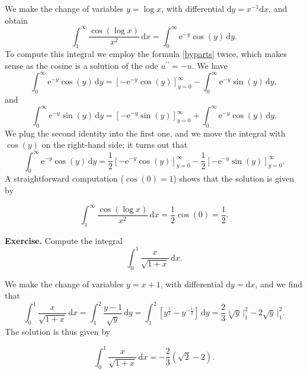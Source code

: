 \documentclass[a4paper,10 pt]{report}
\newcommand{\finalanswer}[1]{%
    \begin{finalAnswer}
    \[
        #1
    \]
    \end{finalAnswer}
}
\theoremstyle{definition}
\begin{document}
\begin{solutionBox} We make the change of variables $y = \log x$, with differential $\mathrm{d}y = x^{-1} \mathrm{d}x$, and obtain
\begin{equation*} \int_1^\infty \frac{ \cos(\log x) }{x^2} \, \mathrm{d}x = \int_0^\infty \mathrm{e}^{-y} \cos(y) \, \mathrm{d}y.\end{equation*}
To compute this integral we employ the formula \eqref{byparts} twice, which makes sense as the cosine is a solution of the ode $u^{\prime \prime} = - u$. We have
\begin{equation*} \int_0^\infty \mathrm{e}^{-y} \cos(y) \, \mathrm{d}y = \left[ - \mathrm{e}^{-y} \cos(y) \right]_{y = 0}^{\infty} - \int_0^\infty \mathrm{e}^{-y} \sin(y) \, \mathrm{d}y, \end{equation*}
and
\begin{equation*} \int_0^\infty \mathrm{e}^{-y} \sin(y) \, \mathrm{d}y = \left[ - \mathrm{e}^{-y} \sin(y) \right]_{y = 0}^{\infty} + \int_0^\infty \mathrm{e}^{-y} \cos(y) \, \mathrm{d}y. \end{equation*}
We plug the second identity into the first one, and we move the integral with $\cos(y)$ on the right-hand side; it turns out that
\begin{equation*} \int_0^\infty \mathrm{e}^{-y} \cos(y) \, \mathrm{d}y = \frac{1}{2} \left[ - \mathrm{e}^{-y} \cos(y) \right]_{y = 0}^{\infty} - \frac{1}{2} \left[ - \mathrm{e}^{-y} \sin(y) \right]_{y = 0}^{\infty}. \end{equation*}
A straightforward computation ($\cos(0) = 1$) shows that the solution is given by
\finalanswer{
 \int_1^\infty \frac{ \cos(\log x) }{x^2} \, \mathrm{d}x = \frac{1}{2} \cos(0) = \frac{1}{2}.
}\end{solutionBox}

\begin{exerciseBox} \textbf{Exercise.} Compute the integral
\begin{equation*} \int_0^1 \frac{x}{\sqrt{1 + x}} \, \mathrm{d}x.\end{equation*}
\end{exerciseBox}

\begin{solutionBox} We make the change of variables $y = x + 1$, with differential $\mathrm{d}y = \mathrm{d}x$, and we find that 
\begin{equation*} \int_0^1 \frac{x}{\sqrt{1 + x}} \, \mathrm{d}x = \int_1^2 \frac{y - 1}{\sqrt{y}} \, \mathrm{d}y = \int_1^2 \left[ y^{\frac{1}{2}} - y^{-\frac{1}{2}} \right] \, \mathrm{d}y = \frac{2}{3} \sqrt[3]{y} \, \big|_{1}^2 - 2 \sqrt{y} \, \big|_{1}^2.\end{equation*}
The solution is thus given by
\finalanswer{
\int_0^1 \frac{x}{\sqrt{1 + x}} \, \mathrm{d}x = -\frac{2}{3}(\sqrt{2} - 2).
}\end{solutionBox}
\end{document}
